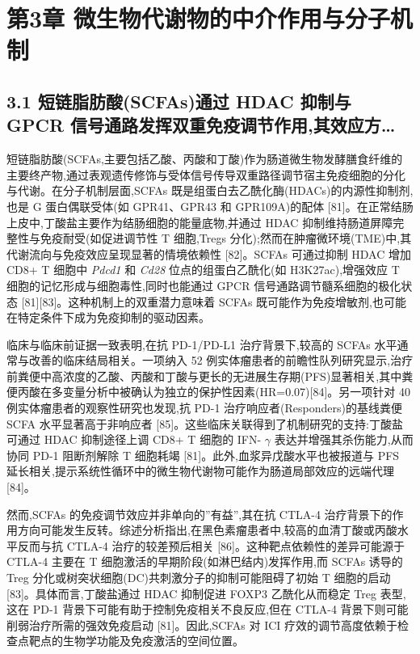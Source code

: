 \section{第3章 微生物代谢物的中介作用与分子机制}\label{ux7b2c3ux7ae0-ux5faeux751fux7269ux4ee3ux8c22ux7269ux7684ux4e2dux4ecbux4f5cux7528ux4e0eux5206ux5b50ux673aux5236}

\subsection{3.1 短链脂肪酸(SCFAs)通过 HDAC 抑制与 GPCR 信号通路发挥双重免疫调节作用,其效应方\ldots{}}\label{ux77edux94feux8102ux80aaux9178scfasux901aux8fc7-hdac-ux6291ux5236ux4e0e-gpcr-ux4fe1ux53f7ux901aux8defux53d1ux6325ux53ccux91cdux514dux75abux8c03ux8282ux4f5cux7528ux5176ux6548ux5e94ux65b9}

短链脂肪酸(SCFAs,主要包括乙酸、丙酸和丁酸)作为肠道微生物发酵膳食纤维的主要终产物,通过表观遗传修饰与受体信号传导双重路径调节宿主免疫细胞的分化与代谢。在分子机制层面,SCFAs 既是组蛋白去乙酰化酶(HDACs)的内源性抑制剂,也是 G 蛋白偶联受体(如 GPR41、GPR43 和 GPR109A)的配体 {[}81{]}。在正常结肠上皮中,丁酸盐主要作为结肠细胞的能量底物,并通过 HDAC 抑制维持肠道屏障完整性与免疫耐受(如促进调节性 T 细胞,Tregs 分化);然而在肿瘤微环境(TME)中,其代谢流向与免疫效应呈现显著的情境依赖性 {[}82{]}。SCFAs 可通过抑制 HDAC 增加 CD8+ T 细胞中 \emph{Pdcd1} 和 \emph{Cd28} 位点的组蛋白乙酰化(如 H3K27ac),增强效应 T 细胞的记忆形成与细胞毒性,同时也能通过 GPCR 信号通路调节髓系细胞的极化状态 {[}81{]}{[}83{]}。这种机制上的双重潜力意味着 SCFAs 既可能作为免疫增敏剂,也可能在特定条件下成为免疫抑制的驱动因素。

临床与临床前证据一致表明,在抗 PD-1/PD-L1 治疗背景下,较高的 SCFAs 水平通常与改善的临床结局相关。一项纳入 52 例实体瘤患者的前瞻性队列研究显示,治疗前粪便中高浓度的乙酸、丙酸和丁酸与更长的无进展生存期(PFS)显著相关,其中粪便丙酸在多变量分析中被确认为独立的保护性因素(HR=0.07){[}84{]}。另一项针对 40 例实体瘤患者的观察性研究也发现,抗 PD-1 治疗响应者(Responders)的基线粪便 SCFA 水平显著高于非响应者 {[}85{]}。这些临床关联得到了机制研究的支持:丁酸盐可通过 HDAC 抑制途径上调 CD8+ T 细胞的 IFN- \(\gamma\) 表达并增强其杀伤能力,从而协同 PD-1 阻断剂解除 T 细胞耗竭 {[}81{]}。此外,血浆异戊酸水平也被报道与 PFS 延长相关,提示系统性循环中的微生物代谢物可能作为肠道局部效应的远端代理 {[}84{]}。

然而,SCFAs 的免疫调节效应并非单向的''有益'',其在抗 CTLA-4 治疗背景下的作用方向可能发生反转。综述分析指出,在黑色素瘤患者中,较高的血清丁酸或丙酸水平反而与抗 CTLA-4 治疗的较差预后相关 {[}86{]}。这种靶点依赖性的差异可能源于 CTLA-4 主要在 T 细胞激活的早期阶段(如淋巴结内)发挥作用,而 SCFAs 诱导的 Treg 分化或树突状细胞(DC)共刺激分子的抑制可能阻碍了初始 T 细胞的启动 {[}83{]}。具体而言,丁酸盐通过 HDAC 抑制促进 FOXP3 乙酰化从而稳定 Treg 表型,这在 PD-1 背景下可能有助于控制免疫相关不良反应,但在 CTLA-4 背景下则可能削弱治疗所需的强效免疫启动 {[}81{]}。因此,SCFAs 对 ICI 疗效的调节高度依赖于检查点靶点的生物学功能及免疫激活的空间位置。

